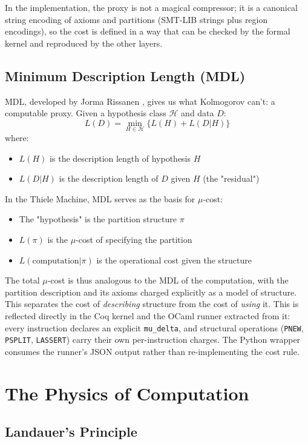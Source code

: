 In the implementation, the proxy is not a magical compressor; it is a canonical string encoding of axioms and partitions (SMT-LIB strings plus region encodings), so the cost is defined in a way that can be checked by the formal kernel and reproduced by the other layers.

\subsection{Minimum Description Length (MDL)}

MDL, developed by Jorma Rissanen \cite{rissanen1978modeling}, gives us what Kolmogorov can't: a computable proxy. Given a hypothesis class $\mathcal{H}$ and data $D$:
\[
L(D) = \min_{H \in \mathcal{H}} \{L(H) + L(D|H)\}
\]
where:
\begin{itemize}
    \item $L(H)$ is the description length of hypothesis $H$
    \item $L(D|H)$ is the description length of $D$ given $H$ (the "residual")
\end{itemize}

In the Thiele Machine, MDL serves as the basis for $\mu$-cost:
\begin{itemize}
    \item The "hypothesis" is the partition structure $\pi$
    \item $L(\pi)$ is the $\mu$-cost of specifying the partition
    \item $L(\text{computation}|\pi)$ is the operational cost given the structure
\end{itemize}

The total $\mu$-cost is thus analogous to the MDL of the computation, with the partition description and its axioms charged explicitly as a model of structure. This separates the cost of \emph{describing} structure from the cost of \emph{using} it.
This is reflected directly in the Coq kernel and the OCaml runner extracted from it: every instruction declares an explicit \texttt{mu\_delta}, and structural operations (\texttt{PNEW}, \texttt{PSPLIT}, \texttt{LASSERT}) carry their own per-instruction charges. The Python wrapper consumes the runner's JSON output rather than re-implementing the cost rule.

\section{The Physics of Computation}

\subsection{Landauer's Principle}

